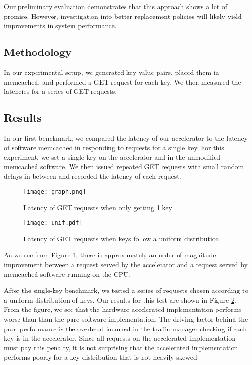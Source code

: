 Our preliminary evaluation demonstrates that this approach shows a lot of
promise. However, investigation into better replacement policies will
likely yield improvements in system performance.

\subsection{Methodology}

In our experimental setup, we generated key-value pairs, placed them in
memcached, and performed a GET request for each key. We then measured the
latencies for a series of GET requests.

\subsection{Results}

In our first benchmark, we compared the latency of our accelerator to the
latency of software memcached in responding to requests for a single key.
For this experiment, we set a single key on the accelerator and in the
unmodified memcached software. We then issued repeated GET requests with
small random delays in between and recorded the latency of each request.

\begin{figure}[t]
\begin{center}
\texttt{[image: graph.png]}
\caption{Latency of GET requests when only getting 1 key}
\label{fig:one-req}
\end{center}
\end{figure}

\begin{figure}[t]
\begin{center}
\texttt{[image: unif.pdf]}
\caption{Latency of GET requests when keys follow a uniform distribution}
\label{fig:unif}
\end{center}
\end{figure}

As we see from Figure \ref{fig:one-req}, there is approximately an order of
magnitude improvement between a request served by the accelerator and a
request served by memcached software running on the CPU.

After the single-key benchmark, we tested a series of requests chosen
according to a uniform distribution of keys. Our results for this test are
shown in Figure \ref{fig:unif}. From the figure, we see that the
hardware-accelerated implementation performs worse than than the pure software
implementation. The driving factor behind the poor performance is the overhead
incurred in the traffic manager checking if each key is in the accelerator.
Since all requests on the accelerated implementation must pay this penalty,
it is not surprising that the accelerated implementation performs poorly for
a key distribution that is not heavily skewed.

